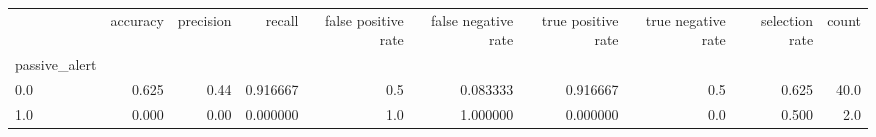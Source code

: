 \begin{tabular}{lrrrrrrrrr}
\toprule
{} &  accuracy &  precision &    recall &  false positive rate &  false negative rate &  true positive rate &  true negative rate &  selection rate &  count \\
passive\_alert &           &            &           &                      &                      &                     &                     &                 &        \\
\midrule
0.0           &     0.625 &       0.44 &  0.916667 &                  0.5 &             0.083333 &            0.916667 &                 0.5 &           0.625 &   40.0 \\
1.0           &     0.000 &       0.00 &  0.000000 &                  1.0 &             1.000000 &            0.000000 &                 0.0 &           0.500 &    2.0 \\
\bottomrule
\end{tabular}
